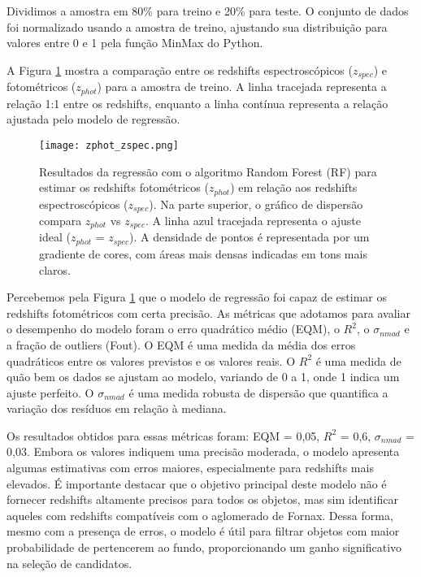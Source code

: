 Dividimos a amostra em 80\% para treino e 20\% para teste. O conjunto de dados foi normalizado usando a amostra de treino, ajustando sua distribuição para valores entre 0 e 1 pela função MinMax do Python. 

A Figura \ref{zphot_zspec} mostra a comparação entre os redshifts espectroscópicos (\textit{$z_{spec}$}) e fotométricos (\textit{$z_{phot}$}) para a amostra de treino. A linha tracejada representa a relação 1:1 entre os redshifts, enquanto a linha contínua representa a relação ajustada pelo modelo de regressão.

\begin{figure}[!ht]
    \centering
    \texttt{[image: zphot\_zspec.png]}
    \caption[]{Resultados da regressão com o algoritmo Random Forest (RF) para estimar os redshifts fotométricos (\textit{$z_{phot}$}) em relação aos redshifts espectroscópicos (\textit{$z_{spec}$}). Na parte superior, o gráfico de dispersão compara \textit{$z_{phot}$} vs \textit{$z_{spec}$}. A linha azul tracejada representa o ajuste ideal (\textit{$z_{phot}$} = \textit{$z_{spec}$}). A densidade de pontos é representada por um gradiente de cores, com áreas mais densas indicadas em tons mais claros.}
    \label{zphot_zspec}
\end{figure}

Percebemos pela Figura \ref{zphot_zspec} que o modelo de regressão foi capaz de estimar os redshifts fotométricos com certa precisão. As métricas que adotamos para avaliar o desempenho do modelo foram o erro quadrático médio (EQM), o $R^2$, o $\sigma_{nmad}$ e a fração de outliers (Fout). O EQM é uma medida da média dos erros quadráticos entre os valores previstos e os valores reais. O $R^2$ é uma medida de quão bem os dados se ajustam ao modelo, variando de 0 a 1, onde 1 indica um ajuste perfeito. O $\sigma_{nmad}$ é uma medida robusta de dispersão que quantifica a variação dos resíduos em relação à mediana. 



Os resultados obtidos para essas métricas foram: EQM = 0,05, $R^2$ = 0,6, $\sigma_{nmad}$ = 0,03. Embora os valores indiquem uma precisão moderada, o modelo apresenta algumas estimativas com erros maiores, especialmente para redshifts mais elevados. É importante destacar que o objetivo principal deste modelo não é fornecer redshifts altamente precisos para todos os objetos, mas sim identificar aqueles com redshifts compatíveis com o aglomerado de Fornax. Dessa forma, mesmo com a presença de erros, o modelo é útil para filtrar objetos com maior probabilidade de pertencerem ao fundo, proporcionando um ganho significativo na seleção de candidatos.

